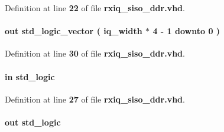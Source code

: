 Definition at line {\bf 22} of file {\bf rxiq\+\_\+siso\+\_\+ddr.\+vhd}.

\paragraph[{fifo\+\_\+wdata}]{ {\bfseries \textcolor{keywordflow}{out}\textcolor{vhdlchar}{ }} {\bfseries \textcolor{comment}{std\+\_\+logic\+\_\+vector}\textcolor{vhdlchar}{ }\textcolor{vhdlchar}{(}\textcolor{vhdlchar}{ }\textcolor{vhdlchar}{ }\textcolor{vhdlchar}{ }\textcolor{vhdlchar}{ }{\bfseries {\bf iq\+\_\+width}} \textcolor{vhdlchar}{$\ast$}\textcolor{vhdlchar}{ } \textcolor{vhdldigit}{4} \textcolor{vhdlchar}{-\/}\textcolor{vhdlchar}{ } \textcolor{vhdldigit}{1} \textcolor{vhdlchar}{ }\textcolor{keywordflow}{downto}\textcolor{vhdlchar}{ }\textcolor{vhdlchar}{ } \textcolor{vhdldigit}{0} \textcolor{vhdlchar}{ }\textcolor{vhdlchar}{)}\textcolor{vhdlchar}{ }} \hspace{0.3cm}{\ttfamily [Port]}}\label{classrxiq__siso__ddr_a880b1371c4c1600fe490c979402d668f}


Definition at line {\bf 30} of file {\bf rxiq\+\_\+siso\+\_\+ddr.\+vhd}.

\paragraph[{fifo\+\_\+wfull}]{ {\bfseries \textcolor{keywordflow}{in}\textcolor{vhdlchar}{ }} {\bfseries \textcolor{comment}{std\+\_\+logic}\textcolor{vhdlchar}{ }} \hspace{0.3cm}{\ttfamily [Port]}}\label{classrxiq__siso__ddr_a63de1b8160d1ffec718f19920aa9a2a1}


Definition at line {\bf 27} of file {\bf rxiq\+\_\+siso\+\_\+ddr.\+vhd}.

\paragraph[{fifo\+\_\+wrreq}]{ {\bfseries \textcolor{keywordflow}{out}\textcolor{vhdlchar}{ }} {\bfseries \textcolor{comment}{std\+\_\+logic}\textcolor{vhdlchar}{ }} \hspace{0.3cm}{\ttfamily [Port]}}\label{classrxiq__siso__ddr_a4643410c72f0390bde3d442228a1dfd2}


